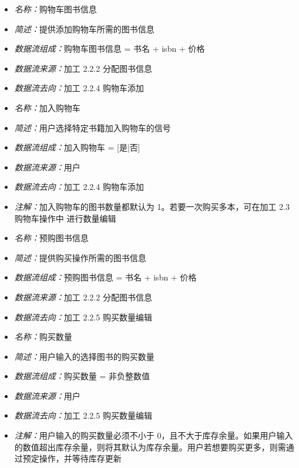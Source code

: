 \vspace{-1mm}

\begin{itemize}
	\item \textit{名称：}购物车图书信息
	\item \textit{简述：}提供添加购物车所需的图书信息
	\item \textit{数据流组成：}购物车图书信息  = 书名 + isbn + 价格
	\item \textit{数据流来源：}加工 2.2.2 分配图书信息
	\item \textit{数据流去向：}加工 2.2.4 购物车添加
\end{itemize}

\vspace{-1mm}

\begin{itemize}
	\item \textit{名称：}加入购物车
	\item \textit{简述：}用户选择特定书籍加入购物车的信号
	\item \textit{数据流组成：}加入购物车 = [是|否]
	\item \textit{数据流来源：}用户
	\item \textit{数据流去向：}加工 2.2.4 购物车添加
	\item \textit{注解：}加入购物车的图书数量都默认为 1。若要一次购买多本，可在加工 2.3 购物车操作中	进行数量编辑
\end{itemize}

\vspace{-1mm}

\begin{itemize}
\item \textit{名称：}预购图书信息
\item \textit{简述：}提供购买操作所需的图书信息
\item \textit{数据流组成：}预购图书信息  = 书名 + isbn + 价格
\item \textit{数据流来源：}加工 2.2.2 分配图书信息
\item \textit{数据流去向：}加工 2.2.5 购买数量编辑
\end{itemize}

\vspace{-1mm}

\begin{itemize}
	\item \textit{名称：}购买数量
	\item \textit{简述：}用户输入的选择图书的购买数量
	\item \textit{数据流组成：}购买数量 = 非负整数值
	\item \textit{数据流来源：}用户
	\item \textit{数据流去向：}加工 2.2.5 购买数量编辑
	\item \textit{注解：}用户输入的购买数量必须不小于 0，且不大于库存余量。如果用户输入的数值超出库存余量，则将其默认为库存余量。用户若想要购买更多，则需通过预定操作，并等待库存更新
\end{itemize}

